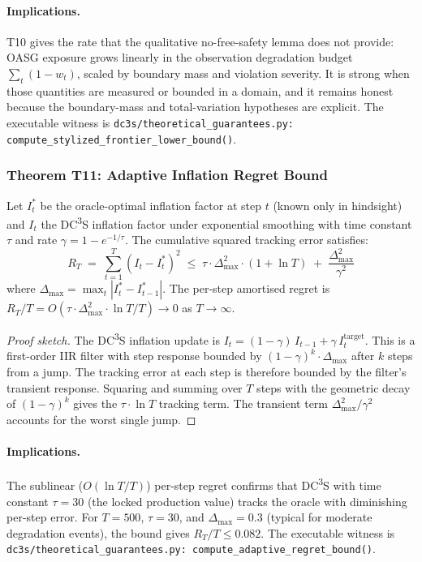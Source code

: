 \paragraph{Implications.}
T10 gives the rate that the qualitative no-free-safety lemma does not provide:
OASG exposure grows linearly in the observation degradation budget
$\sum_t(1-w_t)$, scaled by boundary mass and violation severity.  It is strong
when those quantities are measured or bounded in a domain, and it remains
honest because the boundary-mass and total-variation hypotheses are explicit.
The executable witness is
\texttt{dc3s/theoretical\_guarantees.py:
compute\_stylized\_frontier\_lower\_bound()}.

\subsubsection{Theorem T11: Adaptive Inflation Regret Bound}

\begin{theorem}\label{thm:deep-regret}
Let $I_t^*$ be the oracle-optimal inflation factor at step $t$ (known only in
hindsight) and $I_t$ the DC\textsuperscript{3}S inflation factor under
exponential smoothing with time constant $\tau$ and rate
$\gamma = 1 - e^{-1/\tau}$.  The cumulative squared tracking error satisfies:
\[
  R_T \;=\; \sum_{t=1}^T (I_t - I_t^*)^2
  \;\le\; \tau \cdot \Delta_{\max}^2 \cdot (1 + \ln T)
         \;+\; \frac{\Delta_{\max}^2}{\gamma^2}
\]
where $\Delta_{\max} = \max_t |I_t^* - I_{t-1}^*|$.  The per-step amortised
regret is $R_T / T = O(\tau \cdot \Delta_{\max}^2 \cdot \ln T / T) \to 0$
as $T \to \infty$.
\end{theorem}

\begin{proof}[Proof sketch]
The DC\textsuperscript{3}S inflation update is $I_t = (1 - \gamma)\,I_{t-1} + \gamma\,I_t^{\mathrm{target}}$.
This is a first-order IIR filter with step response bounded by
$(1 - \gamma)^k \cdot \Delta_{\max}$ after $k$ steps from a jump.  The
tracking error at each step is therefore bounded by the filter's transient
response.  Squaring and summing over $T$ steps with the geometric decay of
$(1 - \gamma)^k$ gives the $\tau \cdot \ln T$ tracking term.  The transient
term $\Delta_{\max}^2 / \gamma^2$ accounts for the worst single jump.
\end{proof}

\paragraph{Implications.}
The sublinear ($O(\ln T / T)$) per-step regret confirms that
DC\textsuperscript{3}S with time constant $\tau = 30$ (the locked production
value) tracks the oracle with diminishing per-step error.  For $T = 500$,
$\tau = 30$, and $\Delta_{\max} = 0.3$ (typical for moderate degradation
events), the bound gives $R_T / T \le 0.082$.
The executable witness is \texttt{dc3s/theoretical\_guarantees.py:
compute\_adaptive\_regret\_bound()}.

